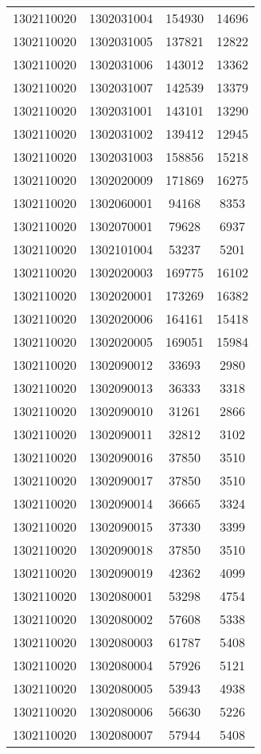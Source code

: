 \begin{longtable}[h]{llcc}
		1302110020 & 1302031004 & 154930 & 14696\\
		1302110020 & 1302031005 & 137821 & 12822\\
		1302110020 & 1302031006 & 143012 & 13362\\
		1302110020 & 1302031007 & 142539 & 13379\\
		1302110020 & 1302031001 & 143101 & 13290\\
		1302110020 & 1302031002 & 139412 & 12945\\
		1302110020 & 1302031003 & 158856 & 15218\\
		1302110020 & 1302020009 & 171869 & 16275\\
		1302110020 & 1302060001 & 94168 & 8353\\
		1302110020 & 1302070001 & 79628 & 6937\\
		1302110020 & 1302101004 & 53237 & 5201\\
		1302110020 & 1302020003 & 169775 & 16102\\
		1302110020 & 1302020001 & 173269 & 16382\\
		1302110020 & 1302020006 & 164161 & 15418\\
		1302110020 & 1302020005 & 169051 & 15984\\
		1302110020 & 1302090012 & 33693 & 2980\\
		1302110020 & 1302090013 & 36333 & 3318\\
		1302110020 & 1302090010 & 31261 & 2866\\
		1302110020 & 1302090011 & 32812 & 3102\\
		1302110020 & 1302090016 & 37850 & 3510\\
		1302110020 & 1302090017 & 37850 & 3510\\
		1302110020 & 1302090014 & 36665 & 3324\\
		1302110020 & 1302090015 & 37330 & 3399\\
		1302110020 & 1302090018 & 37850 & 3510\\
		1302110020 & 1302090019 & 42362 & 4099\\
		1302110020 & 1302080001 & 53298 & 4754\\
		1302110020 & 1302080002 & 57608 & 5338\\
		1302110020 & 1302080003 & 61787 & 5408\\
		1302110020 & 1302080004 & 57926 & 5121\\
		1302110020 & 1302080005 & 53943 & 4938\\
		1302110020 & 1302080006 & 56630 & 5226\\
		1302110020 & 1302080007 & 57944 & 5408\\

\end{longtable}
